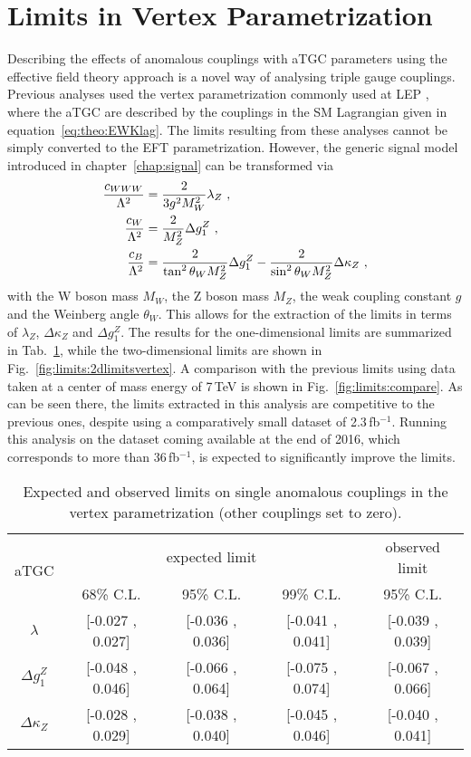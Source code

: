\section{Limits in Vertex Parametrization}
\label{sec:vertex}
Describing the effects of anomalous couplings with aTGC parameters using the effective field theory approach is a novel way of analysing triple gauge couplings. Previous analyses used the vertex parametrization commonly used at LEP \cite{LEPatgc}, where the aTGC are described by the couplings in the SM Lagrangian given in equation~\ref{eq:theo:EWKlag}. The limits resulting from these analyses cannot be simply converted to the EFT parametrization. However, the generic signal model introduced in chapter~\ref{chap:signal} can be transformed via
\begin{align}
\frac{c_{WWW}}{\Lambda^2} &= \frac{2}{3g^2M_W^2}\lambda_Z ~, \\
\frac{c_{W}}{\Lambda^2}  &= \frac{2}{M_Z^2}\Delta g_1^Z ~, \\
\frac{c_{B}}{\Lambda^2}   &= \frac{2}{\tan^2\theta_W M_Z^2}\Delta g_1^Z - \frac{2}{\sin^2\theta_W M_Z^2}\Delta\kappa_Z ~,
\end{align}
with the W boson mass $M_W$, the Z boson mass $M_Z$, the weak coupling constant $g$ and the Weinberg angle $\theta_W$. This allows for the extraction of the limits in terms of $\lambda_Z$, $\Delta \kappa_Z$ and $\Delta g_1^Z$. The results for the one-dimensional limits are summarized in Tab.~\ref{tab:limits:1dlimits_vertex}, while the two-dimensional limits are shown in Fig.~\ref{fig:limits:2dlimitsvertex}. A comparison with the previous limits using data taken at a center of mass energy of 7\,TeV is shown in Fig.~\ref{fig:limits:compare}. As can be seen there, the limits extracted in this analysis are competitive to the previous ones, despite using a comparatively small dataset of 2.3\,fb$^{-1}$. Running this analysis on the dataset coming available at the end of 2016, which corresponds to more than $36$\,fb$^{-1}$, is expected to significantly improve the limits.

\begin{table}
	\centering
	\caption[Expected and observed limits on single anomalous couplings in the vertex parametrization]{Expected and observed limits on single anomalous couplings in the vertex parametrization (other couplings set to zero).}
	\label{tab:limits:1dlimits_vertex}
	\begin{tabular}{ccccc}
	\hline
	\multirow{2}{*}{aTGC}              &     \multicolumn{3}{c}{expected limit} & observed limit\\
	& 68\% C.L. & 95\% C.L. & 99\% C.L. & 95\% C.L.\\
	\hline
	$\lambda$          & [-0.027 , 0.027] & [-0.036 , 0.036] & [-0.041 , 0.041] & [-0.039 , 0.039] \\
	$\Delta g_1^Z$     & [-0.048 , 0.046] & [-0.066 , 0.064] & [-0.075 , 0.074] & [-0.067 , 0.066] \\
	$\Delta\kappa_Z$   & [-0.028 , 0.029] & [-0.038 , 0.040] & [-0.045 , 0.046] & [-0.040 , 0.041] \\
	\hline
	\end{tabular}
\end{table}

